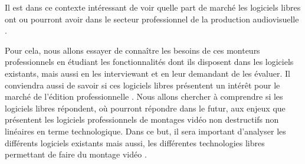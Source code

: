 Il est dans ce contexte intéressant de voir quelle part de marché les
logiciels libres ont ou pourront avoir dans le secteur professionnel de
la production audiovisuelle .

Pour cela, nous allons essayer de connaître les besoins de ces monteurs
professionnels en étudiant les fonctionnalités dont ils disposent
dans les logiciels existants, mais aussi en les interviewant et en
leur demandant de les évaluer.  Il conviendra aussi de savoir si ces
logiciels libres présentent un intérêt pour le marché de l'édition
professionnelle . Nous allons chercher à comprendre si les logiciels
libres répondent, où pourront répondre dans le futur, aux enjeux
que présentent les logiciels professionnels de montages vidéo non
destructifs non linéaires en terme technologique. Dans ce but, il sera
important d'analyser les différents logiciels existants mais aussi, les
différentes technologies libres permettant de faire du montage vidéo .
